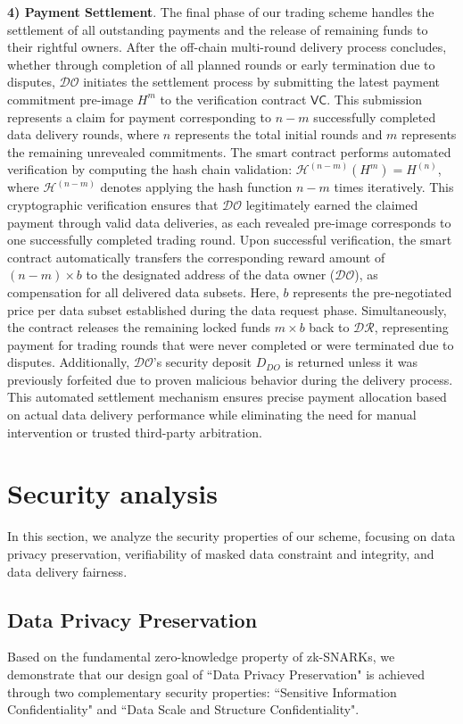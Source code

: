 \documentclass[journal]{IEEEtran}
\begin{document}
\textbf{4) Payment Settlement}.
The final phase of our trading scheme handles the settlement of all outstanding payments and the release of remaining funds to their rightful owners. After the off-chain multi-round delivery process concludes, whether through completion of all planned rounds or early termination due to disputes, $\mathcal{DO}$ initiates the settlement process by submitting the latest payment commitment pre-image $H^m$ to the verification contract $\mathsf{VC}$. This submission represents a claim for payment corresponding to $n-m$ successfully completed data delivery rounds, where $n$ represents the total initial rounds and $m$ represents the remaining unrevealed commitments. The smart contract performs automated verification by computing the hash chain validation: $\mathcal{H}^{(n-m)}(H^m) = H^{(n)}$, where $\mathcal{H}^{(n-m)}$ denotes applying the hash function $n-m$ times iteratively. This cryptographic verification ensures that $\mathcal{DO}$ legitimately earned the claimed payment through valid data deliveries, as each revealed pre-image corresponds to one successfully completed trading round. Upon successful verification, the smart contract automatically transfers the corresponding reward amount of $(n-m) \times b$ to the designated address of the data owner ($\mathcal{DO}$), as compensation for all delivered data subsets. Here, $b$ represents the pre-negotiated price per data subset established during the data request phase. Simultaneously, the contract releases the remaining locked funds $m \times b$ back to $\mathcal{DR}$, representing payment for trading rounds that were never completed or were terminated due to disputes. Additionally, $\mathcal{DO}$'s security deposit $D_{DO}$ is returned unless it was previously forfeited due to proven malicious behavior during the delivery process. This automated settlement mechanism ensures precise payment allocation based on actual data delivery performance while eliminating the need for manual intervention or trusted third-party arbitration.

\section{Security analysis }\label{section:security_analysis}

In this section, we analyze the security properties of our scheme, focusing on data privacy preservation, verifiability of masked data constraint and integrity, and data delivery fairness.

\subsection{Data Privacy Preservation}
Based on the fundamental zero-knowledge property of zk-SNARKs, we demonstrate that our design goal of ``Data Privacy Preservation" is achieved through two complementary security properties: ``Sensitive Information Confidentiality" and ``Data Scale and Structure Confidentiality".
\end{document}
